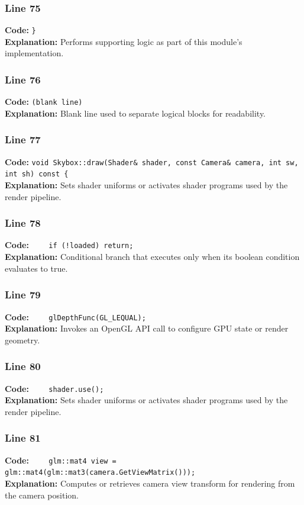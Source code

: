 \documentclass[11pt,a4paper]{article}
\begin{document}
\subsubsection*{Line 75}
\textbf{Code:} \verb|}|\\
\textbf{Explanation:} Performs supporting logic as part of this module's implementation.

\subsubsection*{Line 76}
\textbf{Code:} \texttt{(blank line)}\\
\textbf{Explanation:} Blank line used to separate logical blocks for readability.

\subsubsection*{Line 77}
\textbf{Code:} \verb|void Skybox::draw(Shader& shader, const Camera& camera, int sw, int sh) const {|\\
\textbf{Explanation:} Sets shader uniforms or activates shader programs used by the render pipeline.

\subsubsection*{Line 78}
\textbf{Code:} \verb|    if (!loaded) return;|\\
\textbf{Explanation:} Conditional branch that executes only when its boolean condition evaluates to true.

\subsubsection*{Line 79}
\textbf{Code:} \verb|    glDepthFunc(GL_LEQUAL);|\\
\textbf{Explanation:} Invokes an OpenGL API call to configure GPU state or render geometry.

\subsubsection*{Line 80}
\textbf{Code:} \verb|    shader.use();|\\
\textbf{Explanation:} Sets shader uniforms or activates shader programs used by the render pipeline.

\subsubsection*{Line 81}
\textbf{Code:} \verb|    glm::mat4 view = glm::mat4(glm::mat3(camera.GetViewMatrix()));|\\
\textbf{Explanation:} Computes or retrieves camera view transform for rendering from the camera position.
\end{document}
